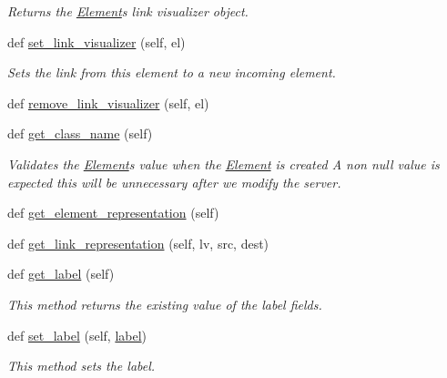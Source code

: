 \begin{DoxyCompactItemize}
\begin{DoxyCompactList}\small\item\em Returns the \hyperlink{class_bridges_1_1_element_1_1_element}{Element}\textquotesingle{}s link visualizer object. \end{DoxyCompactList}\item 
def \hyperlink{class_bridges_1_1_element_1_1_element_a3dff4354421ee704ee7fbfd6fef37207}{set\+\_\+link\+\_\+visualizer} (self, el)
\begin{DoxyCompactList}\small\item\em Sets the link from this element to a new incoming element. \end{DoxyCompactList}\item 
def \hyperlink{class_bridges_1_1_element_1_1_element_ae617a08f086c0b9b62a82b84751c9d1e}{remove\+\_\+link\+\_\+visualizer} (self, el)
\item 
def \hyperlink{class_bridges_1_1_element_1_1_element_a8ac6ce7fef24e2f2dae3b7f56f079e4e}{get\+\_\+class\+\_\+name} (self)
\begin{DoxyCompactList}\small\item\em Validates the \hyperlink{class_bridges_1_1_element_1_1_element}{Element}\textquotesingle{}s value when the \hyperlink{class_bridges_1_1_element_1_1_element}{Element} is created A non null value is expected this will be unnecessary after we modify the server. \end{DoxyCompactList}\item 
def \hyperlink{class_bridges_1_1_element_1_1_element_ad636092154a89fab2488e9e4dcb139fd}{get\+\_\+element\+\_\+representation} (self)
\item 
def \hyperlink{class_bridges_1_1_element_1_1_element_af5801bce7a6a85723b96a64ea2502c3b}{get\+\_\+link\+\_\+representation} (self, lv, src, dest)
\item 
def \hyperlink{class_bridges_1_1_element_1_1_element_ae3daee3d51daa454b15d83d57d1c3b5c}{get\+\_\+label} (self)
\begin{DoxyCompactList}\small\item\em This method returns the existing value of the label fields. \end{DoxyCompactList}\item 
def \hyperlink{class_bridges_1_1_element_1_1_element_a868e30c0f0fcfec4111d8a22e1e946e9}{set\+\_\+label} (self, \hyperlink{class_bridges_1_1_element_1_1_element_a2d89151a20b200117333629fa05cd4b4}{label})
\begin{DoxyCompactList}\small\item\em This method sets the label. \end{DoxyCompactList}\item 

\end{DoxyCompactItemize}
